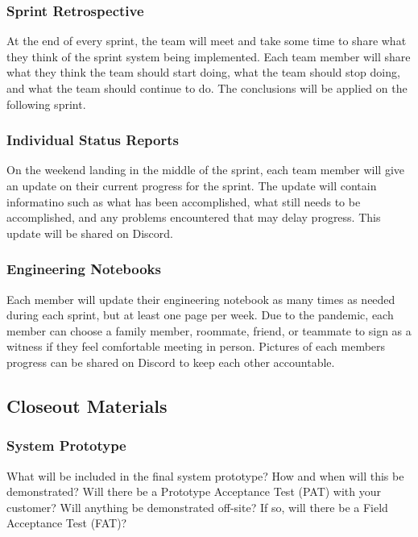 \subsubsection{Sprint Retrospective}

At the end of every sprint, the team will meet and take some time to share what they think of the sprint system being implemented. Each team member will share what they think the team should start doing, what the team should stop doing, and what the team should continue to do. The conclusions will be applied on the following sprint.

\subsubsection{Individual Status Reports}

On the weekend landing in the middle of the sprint, each team member will give an update on their current progress for the sprint. The update will contain informatino such as what has been accomplished, what still needs to be accomplished, and any problems encountered that may delay progress. This update will be shared on Discord.

\subsubsection{Engineering Notebooks}

Each member will update their engineering notebook as many times as needed during each sprint, but at least one page per week. Due to the pandemic, each member can choose a family member, roommate, friend, or teammate to sign as a witness if they feel comfortable meeting in person. Pictures of each members progress can be shared on Discord to keep each other accountable.

\subsection{Closeout Materials}

\subsubsection{System Prototype}
What will be included in the final system prototype? How and when will this be demonstrated? Will there be a Prototype Acceptance Test (PAT) with your customer? Will anything be demonstrated off-site? If so, will there be a Field Acceptance Test (FAT)?

